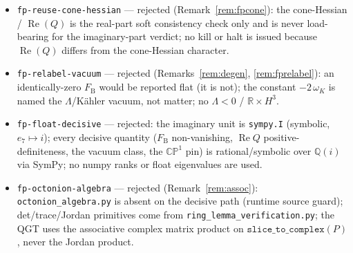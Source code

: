 \documentclass[11pt]{article}
\renewcommand{\Re}{\operatorname{Re}}
\newcommand{\FB}{F_{\mathrm{B}}}
\theoremstyle{plain}
\theoremstyle{definition}
\begin{document}
\begin{itemize}
\item \texttt{fp-reuse-cone-hessian} --- rejected (Remark~\ref{rem:fpcone}): the
  cone-Hessian / $\Re(Q)$ is the real-part soft consistency check only and is never
  load-bearing for the imaginary-part verdict; no kill or halt is issued because
  $\Re(Q)$ differs from the cone-Hessian character.
\item \texttt{fp-relabel-vacuum} --- rejected (Remarks~\ref{rem:degen},
  \ref{rem:fprelabel}): an identically-zero $\FB$ would be reported flat (it is not);
  the constant $-2\,\omega_K$ is named the $\Lambda$/K\"ahler vacuum, not matter; no
  $\Lambda<0$ / $\mathbb{R}\times H^3$.
\item \texttt{fp-float-decisive} --- rejected: the imaginary unit is
  \texttt{sympy.I} (symbolic, $e_7\mapsto i$); every decisive quantity ($\FB$
  non-vanishing, $\Re Q$ positive-definiteness, the vacuum class, the $\mathbb{CP}^1$
  pin) is rational/symbolic over $\mathbb{Q}(i)$ via SymPy; no numpy ranks or float
  eigenvalues are used.
\item \texttt{fp-octonion-algebra} --- rejected (Remark~\ref{rem:assoc}):
  \texttt{octonion\_algebra.py} is absent on the decisive path (runtime source guard);
  det/trace/Jordan primitives come from \texttt{ring\_lemma\_verification.py}; the QGT
  uses the associative complex matrix product on $\texttt{slice\_to\_complex}(P)$,
  never the Jordan product.
\end{itemize}

\end{document}
